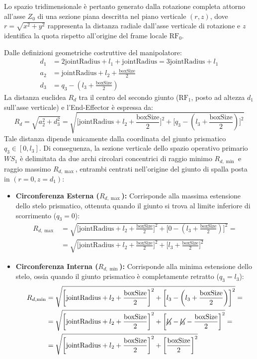 \documentclass[11pt, a4paper]{report}
\begin{document}
Lo spazio tridimensionale è pertanto generato dalla rotazione completa attorno all'asse $Z_0$ di una sezione piana descritta nel piano verticale $(r, z)$, dove $r = \sqrt{x^2 + y^2}$ rappresenta la distanza radiale dall'asse verticale di rotazione e $z$ identifica la quota rispetto all'origine del frame locale $\text{RF}_0$.

Dalle definizioni geometriche costruttive del manipolatore:
\begin{align*}
    d_{1} &= 2\text{jointRadius} + l_{1} + \text{jointRadius} = 3\text{jointRadius} + l_1 \\
    a_{2} &= \text{jointRadius} + l_{2} + \frac{\text{boxSize}}{2} \\
    d_{3} &= q_{3} - \left(l_{3} + \frac{\text{boxSize}}{2}\right)
\end{align*}
La distanza euclidea $R_{d}$ tra il centro del secondo giunto ($\text{RF}_1$, posto ad altezza $d_1$ sull'asse verticale) e l'End-Effector è espressa da:
\[
  R_{d} = \sqrt{a_2^2 + d_3^2} = \sqrt{\biggl[ \text{jointRadius} + l_{2} + \frac{\text{boxSize}}{2} \biggr]^{2} +  \biggl[ q_{3} - \left(l_{3} + \frac{\text{boxSize}}{2}\right) \biggr]^{2}}
\]
Tale distanza dipende unicamente dalla coordinata del giunto prismatico $q_{3} \in [0, l_{3}]$. Di conseguenza, la sezione verticale dello spazio operativo primario $WS_1$ è delimitata da due archi circolari concentrici di raggio minimo $R_{d,\min}$ e raggio massimo $R_{d,\max}$, entrambi centrati nell'origine del giunto di spalla posta in $(r=0, z=d_1)$:
\begin{itemize}
  \item \textbf{Circonferenza Esterna ($R_{d,\max}$):} Corrisponde alla massima estensione dello stelo prismatico, ottenuta quando il giunto si trova al limite inferiore di scorrimento ($q_3 = 0$):
    \begin{align*}
      R_{d,\max} &= \sqrt{\biggl[ \text{jointRadius} + l_{2} + \frac{\text{boxSize}}{2} \biggr]^{2} +  \biggl[ 0 - \left(l_{3} + \frac{\text{boxSize}}{2}\right) \biggr]^{2}} =\\
      &= \sqrt{\biggl[ \text{jointRadius} + l_{2} + \frac{\text{boxSize}}{2} \biggr]^{2} +  \biggl[ l_{3} + \frac{\text{boxSize}}{2} \biggr]^{2}}
    \end{align*}
  \item \textbf{Circonferenza Interna ($R_{d,\min}$):} Corrisponde alla minima estensione dello stelo, ossia quando il giunto prismatico è completamente retratto ($q_3 = l_3$):
    \begin{align*}
      R_{d,\min} &= \sqrt{\biggl[ \text{jointRadius} + l_{2} + \frac{\text{boxSize}}{2} \biggr]^{2} +  \biggl[ l_{3} - \left(l_{3} + \frac{\text{boxSize}}{2}\right) \biggr]^{2}} = \\
      &= \sqrt{\biggl[ \text{jointRadius} + l_{2} + \frac{\text{boxSize}}{2} \biggr]^{2} +  \biggl[ \cancel{l_{3}} - \cancel{l_{3}} - \frac{\text{boxSize}}{2} \biggr]^{2}} =\\
      & = \sqrt{\biggl[ \text{jointRadius} + l_{2} + \frac{\text{boxSize}}{2} \biggr]^{2} +  \biggl[\frac{\text{boxSize}}{2} \biggr]^{2}}
    \end{align*}
\end{itemize}
\end{document}
